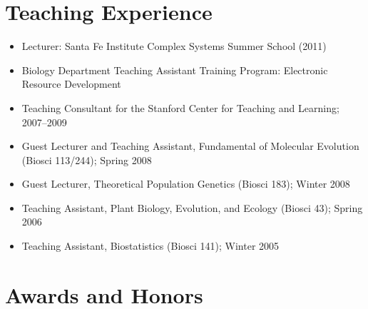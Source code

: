 \documentclass[overlapped,line]{res}
\begin{document}
\begin{resume}

\section{\bf \large Teaching Experience}

\begin{itemize}[$\ast$]
\item Lecturer: Santa Fe Institute Complex Systems Summer School (2011)
\item Biology Department Teaching Assistant Training Program: Electronic Resource Development
\item Teaching Consultant for the Stanford Center for Teaching and Learning; 2007--2009
\item Guest Lecturer and Teaching Assistant, Fundamental of Molecular Evolution (Biosci 113/244); Spring 2008
\item Guest Lecturer, Theoretical Population Genetics (Biosci 183); Winter 2008
\item Teaching Assistant, Plant Biology, Evolution, and Ecology (Biosci 43); Spring 2006
\item Teaching Assistant, Biostatistics (Biosci 141); Winter 2005
\end{itemize}


\section{\bf \large Awards and Honors}


\end{resume}
\end{document}
